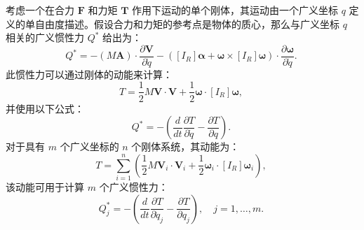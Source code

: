 考虑一个在合力 \( \mathbf{F} \) 和力矩 \( \mathbf{T} \) 作用下运动的单个刚体，其运动由一个广义坐标 \( q \) 定义的单自由度描述。假设合力和力矩的参考点是物体的质心，那么与广义坐标 \( q \) 相关的广义惯性力 \( Q^* \) 给出为：
\[
Q^* = - (M \mathbf{A}) \cdot \frac{\partial \mathbf{V}}{\partial \dot{q}} - \left( [I_R] \boldsymbol{\alpha} + \boldsymbol{\omega} \times [I_R] \boldsymbol{\omega} \right) \cdot \frac{\partial \boldsymbol{\omega}}{\partial \dot{q}}.~
\]
此惯性力可以通过刚体的动能来计算：
\[
T = \frac{1}{2} M \mathbf{V} \cdot \mathbf{V} + \frac{1}{2} \boldsymbol{\omega} \cdot [I_R] \boldsymbol{\omega},~
\]
并使用以下公式：
\[
Q^* = - \left( \frac{d}{dt} \frac{\partial T}{\partial \dot{q}} - \frac{\partial T}{\partial q} \right).~
\]
对于具有 \( m \) 个广义坐标的 \( n \) 个刚体系统，其动能为：
\[
T = \sum_{i=1}^{n} \left( \frac{1}{2} M \mathbf{V}_i \cdot \mathbf{V}_i + \frac{1}{2} \boldsymbol{\omega}_i \cdot [I_R] \boldsymbol{\omega}_i \right),~
\]
该动能可用于计算 \( m \) 个广义惯性力：
\[
Q_j^* = - \left( \frac{d}{dt} \frac{\partial T}{\partial \dot{q}_j} - \frac{\partial T}{\partial q_j} \right), \quad j = 1, \dots, m.~
\]
